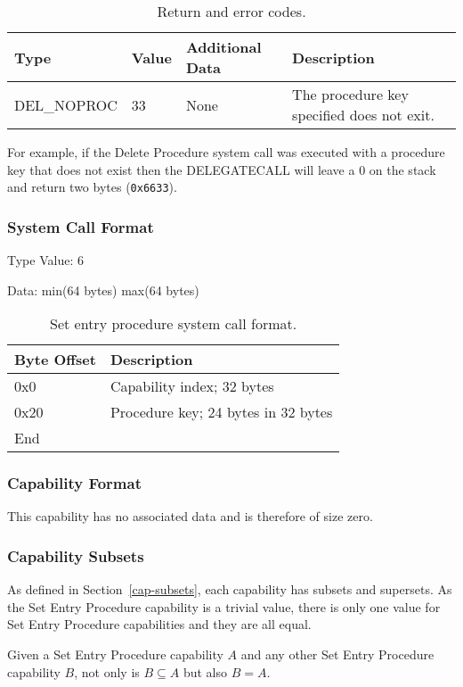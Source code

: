 \documentclass[english,a4paper]{article}
\let\oldparagraph\subsubsection
\renewcommand{\subsubsection}[1]{\oldparagraph{#1}\mbox{}}
\begin{document}
\begin{table}[H]
  \caption{Return and error codes.}
  \centering{}%
  \begin{tabular}{l|l|p{}|p{}}
    \hline
    Type & Value & Additional Data & Description\tabularnewline
    \hline
    \hline
    DEL\_NOPROC  & 33 & None & The procedure key specified does not exit.
      \tabularnewline
    \hline
  \end{tabular}
\end{table}

For example, if the Delete
Procedure system call was executed with a procedure key that does not exist then
the DELEGATECALL will leave a 0 on the stack and return two bytes
(\texttt{0x6633}).

\subsubsection{System Call Format}

Type Value: 6

Data: min(64 bytes) max(64 bytes)

\begin{table}[H]
  \caption{Set entry procedure system call format.}
  \centering{}%
  \begin{tabular}{l|p{}}
    \hline
    Byte Offset & Description\tabularnewline
    \hline
    \hline
    0x0 & Capability index; 32 bytes \tabularnewline
    0x20 & Procedure key; 24 bytes in 32 bytes \tabularnewline
    \hline
    End &  \tabularnewline
    \hline
  \end{tabular}
\end{table}

\subsubsection{Capability Format}
This capability has no associated data and is therefore of size zero.

\subsubsection{Capability Subsets}
As defined in Section~\ref{cap-subsets}, each capability has subsets and
supersets. As the Set Entry Procedure capability is a trivial value, there is
only one value for Set Entry Procedure capabilities and they are all equal.

Given a Set Entry Procedure capability $A$ and any other Set Entry Procedure
capability $B$, not only is $B \subseteq A$ but also $B = A$.
\end{document}
